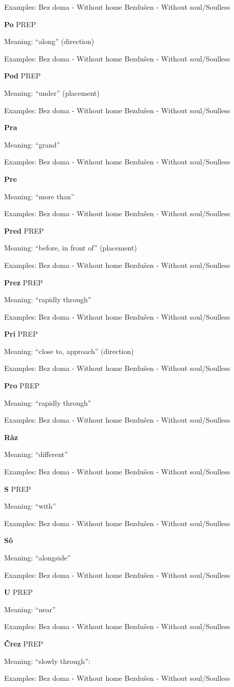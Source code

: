 Examples:
Bez doma - Without home
Bezdušen - Without soul/Soulless 


\textbf{Po} PREP

Meaning: “along” (direction)

Examples:
Bez doma - Without home
Bezdušen - Without soul/Soulless 

\textbf{Pod} PREP

Meaning: “under” (placement)

Examples:
Bez doma - Without home
Bezdušen - Without soul/Soulless 

\textbf{Pra}

Meaning: “grand”

Examples:
Bez doma - Without home
Bezdušen - Without soul/Soulless 

\textbf{Pre}

Meaning: “more than”

Examples:
Bez doma - Without home
Bezdušen - Without soul/Soulless 

\textbf{Pred} PREP

Meaning: “before, in front of” (placement)

Examples:
Bez doma - Without home
Bezdušen - Without soul/Soulless 

\textbf{Prez} PREP

Meaning: “rapidly through”

Examples:
Bez doma - Without home
Bezdušen - Without soul/Soulless 


\textbf{Pri} PREP

Meaning: “close to, approach” (direction)

Examples:
Bez doma - Without home
Bezdušen - Without soul/Soulless 

\textbf{Pro} PREP

Meaning: “rapidly through”

Examples:
Bez doma - Without home
Bezdušen - Without soul/Soulless 

\textbf{Råz}

Meaning: “different”

Examples:
Bez doma - Without home
Bezdušen - Without soul/Soulless 

\textbf{S} PREP

Meaning: “with”

Examples:
Bez doma - Without home
Bezdušen - Without soul/Soulless 

\textbf{Sô}

Meaning: “alongside”

Examples:
Bez doma - Without home
Bezdušen - Without soul/Soulless 

\textbf{U} PREP

Meaning: “near”

Examples:
Bez doma - Without home
Bezdušen - Without soul/Soulless 

\textbf{Črez} PREP

Meaning: “slowly through”:

Examples:
Bez doma - Without home
Bezdušen - Without soul/Soulless 

